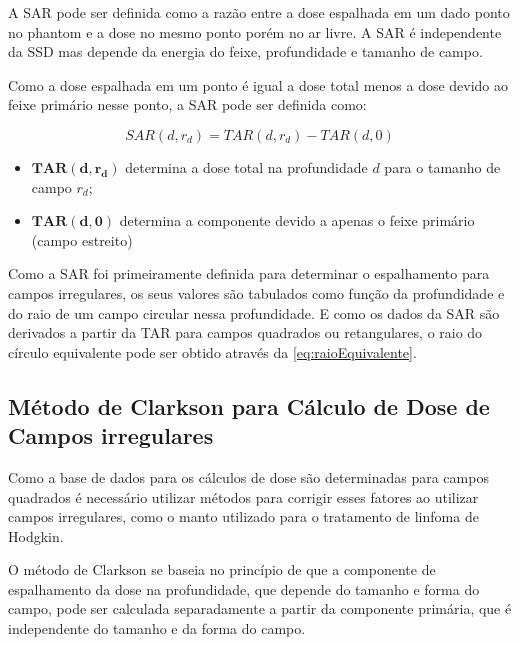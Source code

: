 \documentclass[11pt,a4paper]{article}
\newcounter{exemplo}
\begin{document}
	A SAR pode ser definida como a razão entre a dose espalhada em um dado ponto no phantom e a dose no mesmo ponto porém no ar livre. A SAR é independente da SSD mas depende da energia do feixe, profundidade e tamanho de campo. 

	Como a dose espalhada em um ponto é igual a dose total menos a dose devido ao feixe primário nesse ponto, a SAR pode ser definida como:

		\begin{equation}
			SAR(d,r_d) = TAR(d,r_d) - TAR(d, 0)
		\end{equation}

		\begin{exemplo}[onde:]
			\begin{itemize}
				\item \textcolor{CarnationPink}{$\mathbf{TAR(d,r_d)}$} determina a dose total na profundidade $d$ para o tamanho de campo $r_d$; 
				\item \textcolor{CarnationPink}{$\mathbf{TAR(d, 0)}$} determina a componente devido a apenas o feixe primário (campo estreito)
			\end{itemize}
		\end{exemplo}

	Como a SAR foi primeiramente definida para determinar o espalhamento para campos irregulares, os seus valores são tabulados como função da profundidade e do raio de um campo circular nessa profundidade. E como os dados da SAR são derivados a partir da TAR para campos quadrados ou retangulares, o raio do círculo equivalente pode ser obtido através da \ref{eq:raioEquivalente}.

	\subsection{Método de Clarkson para Cálculo de Dose de Campos irregulares}
	
	Como a base de dados para os cálculos de dose são determinadas para campos quadrados é necessário utilizar métodos para corrigir esses fatores ao utilizar campos irregulares, como o manto utilizado para o tratamento de linfoma de Hodgkin. 

	O método de Clarkson se baseia no princípio de que a componente de espalhamento da dose na profundidade, que depende do tamanho e forma do campo, pode ser calculada separadamente a partir da componente primária, que é independente do tamanho e da forma do campo. 
\end{document}
